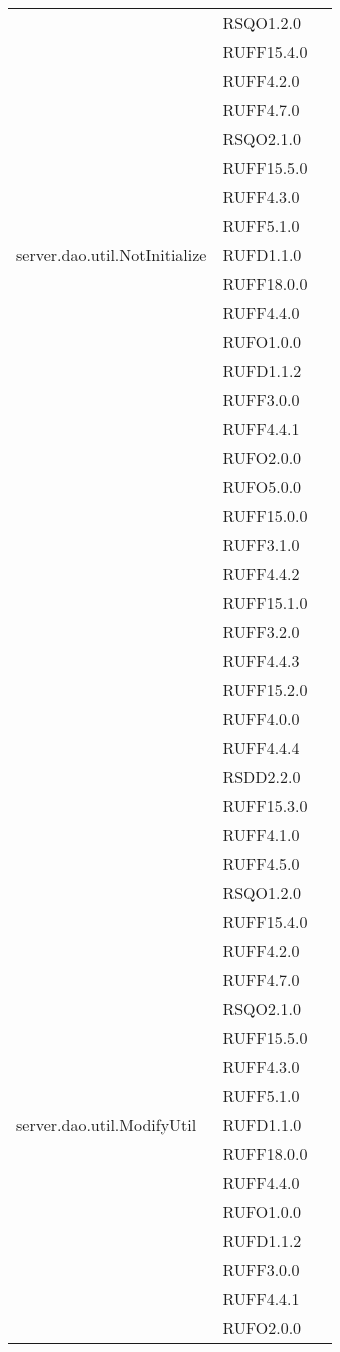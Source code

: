 \begin{center}
\begin{longtable}{lp{}l}
 & RSQO1.2.0 \\
 & RUFF15.4.0 \\
 & RUFF4.2.0 \\
 & RUFF4.7.0 \\
 & RSQO2.1.0 \\
 & RUFF15.5.0 \\
 & RUFF4.3.0 \\
 & RUFF5.1.0 \\
server.dao.util.NotInitialize & RUFD1.1.0 \\
 & RUFF18.0.0 \\
 & RUFF4.4.0 \\
 & RUFO1.0.0 \\
 & RUFD1.1.2 \\
 & RUFF3.0.0 \\
 & RUFF4.4.1 \\
 & RUFO2.0.0 \\
 & RUFO5.0.0 \\
 & RUFF15.0.0 \\
 & RUFF3.1.0 \\
 & RUFF4.4.2 \\
 & RUFF15.1.0 \\
 & RUFF3.2.0 \\
 & RUFF4.4.3 \\
 & RUFF15.2.0 \\
 & RUFF4.0.0 \\
 & RUFF4.4.4 \\
 & RSDD2.2.0 \\
 & RUFF15.3.0 \\
 & RUFF4.1.0 \\
 & RUFF4.5.0 \\
 & RSQO1.2.0 \\
 & RUFF15.4.0 \\
 & RUFF4.2.0 \\
 & RUFF4.7.0 \\
 & RSQO2.1.0 \\
 & RUFF15.5.0 \\
 & RUFF4.3.0 \\
 & RUFF5.1.0 \\
server.dao.util.ModifyUtil & RUFD1.1.0 \\
 & RUFF18.0.0 \\
 & RUFF4.4.0 \\
 & RUFO1.0.0 \\
 & RUFD1.1.2 \\
 & RUFF3.0.0 \\
 & RUFF4.4.1 \\
 & RUFO2.0.0 \\

\end{longtable}
\end{center}
